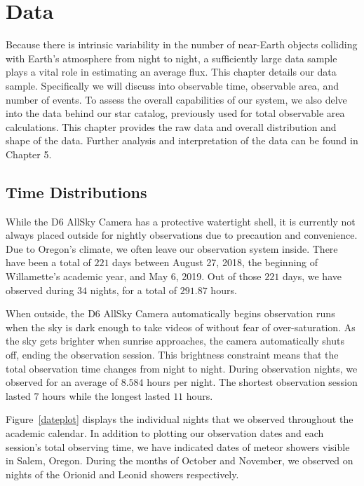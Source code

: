 \chapter{Data}

Because there is intrinsic variability in the number of near-Earth objects colliding with Earth's atmosphere from night to night, a sufficiently large data sample plays a vital role in estimating an average flux.
This chapter details our data sample.
Specifically we will discuss into observable time, observable area, and number of events.  
To assess the overall capabilities of our system, we also delve into the data behind our star catalog, previously used for total observable area calculations.  
This chapter provides the raw data and overall distribution and shape of the data. Further analysis and interpretation of the data can be found in Chapter 5.

\section{Time Distributions}

While the D6 AllSky Camera has a protective watertight shell, it is currently not always placed outside for nightly observations due to precaution and convenience.
Due to Oregon's climate, we often leave our observation system inside.
There have been a total of $221$ days between August 27, 2018, the beginning of Willamette's academic year, and May 6, 2019.
Out of those $221$ days, we have observed during $34$ nights, for a total of $291.87$ hours.

When outside, the D6 AllSky Camera automatically begins observation runs when the sky is dark enough to take videos of without fear of over-saturation.
As the sky gets brighter when sunrise approaches, the camera automatically shuts off, ending the observation session.
This brightness constraint means that the total observation time changes from night to night.
During observation nights, we observed for an average of $8.584$ hours per night.
The shortest observation session lasted $7$ hours while the longest lasted $11$ hours.

Figure~\ref{dateplot} displays the individual nights that we observed throughout the academic calendar. 
In addition to plotting our observation dates and each session's total observing time, we have indicated dates of meteor showers visible in Salem, Oregon.  
During the months of October and November, we observed on nights of the Orionid and Leonid showers respectively.  

